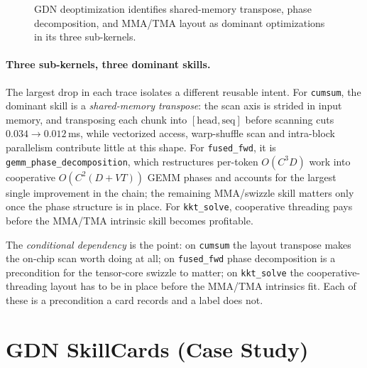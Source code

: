\begin{figure}[!htbp]
{
}
\caption{GDN deoptimization identifies shared-memory transpose, phase decomposition, and MMA/TMA layout as dominant optimizations in its three sub-kernels.}
\label{fig:gdn-trace}
\end{figure}

\paragraph{Three sub-kernels, three dominant skills.}
The largest drop in each trace isolates a different reusable intent. For \texttt{cumsum}, the dominant skill is a \emph{shared-memory transpose}: the scan axis is strided in input memory, and transposing each chunk into $[\text{head},\text{seq}]$ before scanning cuts $0.034{\to}0.012$\,ms, while vectorized access, warp-shuffle scan and intra-block parallelism contribute little at this shape. For \texttt{fused\_fwd}, it is \texttt{gemm\_phase\_decomposition}, which restructures per-token $O(C^3D)$ work into cooperative $O(C^2(D{+}VT))$ GEMM phases and accounts for the largest single improvement in the chain; the remaining MMA/swizzle skill matters only once the phase structure is in place. For \texttt{kkt\_solve}, cooperative threading pays before the MMA/TMA intrinsic skill becomes profitable.

The \emph{conditional dependency} is the point: on \texttt{cumsum} the layout transpose makes the on-chip scan worth doing at all; on \texttt{fused\_fwd} phase decomposition is a precondition for the tensor-core swizzle to matter; on \texttt{kkt\_solve} the cooperative-threading layout has to be in place before the MMA/TMA intrinsics fit. Each of these is a precondition a card records and a label does not.

\section{GDN SkillCards (Case Study)}
\label{app:gdn-skills}

